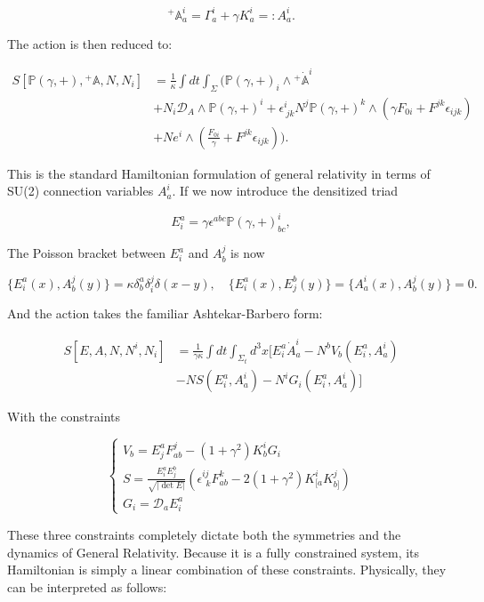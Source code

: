 \documentclass{article}
\begin{document}
$$
{}^{+}\mathbb{A}_a^i = \Gamma_a^i + \gamma K_a^i =: A_a^i.
$$

The action is then reduced to:

$$
\begin{aligned}
S[\mathbb{P}(\gamma, +), {}^{+}\mathbb{A}, N, N_i]
&= \frac{1}{\kappa} \int dt \int_{\Sigma} \Big( \mathbb{P}(\gamma, +)_i \wedge {}^+\dot{\mathbb{A}}^i \\
&+ N_i \mathcal{D}_{A} \wedge \mathbb{P}(\gamma, +)^i + \epsilon^i_{\ jk} N^j \mathbb{P}(\gamma, +)^k \wedge (\gamma F_{0i} + F^{jk}\epsilon_{ijk}) \\
&+ Ne^i \wedge (\frac{F_{0i}}{\gamma} +  F^{jk}\epsilon_{ijk} )\Big).
\end{aligned}
$$

This is the standard Hamiltonian formulation of general relativity in terms of SU(2) connection variables $A_a^i$. If we now introduce the densitized triad

$$
E^a_i = \gamma \epsilon^{abc} \mathbb{P}(\gamma, +)_{bc}^i,
$$

The Poisson bracket between $E^a_i$ and $A^j_b$ is now

$$
\{E^a_i(x), A^j_b(y)\} = \kappa \delta^a_b \delta^j_i \delta(x-y), \quad \{E^a_i(x), E^b_j(y)\} = \{A^i_a(x), A^j_b(y)\} = 0.
$$

And the action takes the familiar Ashtekar-Barbero form:

$$
\begin{aligned}
S[E, A, N, N^i, N_i] &= \frac{1}{\gamma\kappa} \int dt \int_{\Sigma_t} d^3x \Big[ E^a_i \dot{A}^i_a - N^b V_b(E^a_i, A^i_a) \\
&- N S(E^a_i, A^i_a) - N^i G_i(E^a_i, A^i_a) \Big]
\end{aligned}
$$

With the constraints

$$
\begin{cases}
V_b = E^a_j F^j_{ab} - (1+\gamma^2)K^i_b G_i \\
S = \frac{E^a_i E^b_j}{\sqrt{|\det E|}} \left( \epsilon^{ij}_{\ \ k} F^k_{ab} - 2(1+\gamma^2)K^i_{[a} K^j_{b]} \right) \\
G_i = \mathcal{D}_a E^a_i
\end{cases}
$$

These three constraints completely dictate both the symmetries and the dynamics of General Relativity. Because it is a fully constrained system, its Hamiltonian is simply a linear combination of these constraints. Physically, they can be interpreted as follows:
\end{document}
